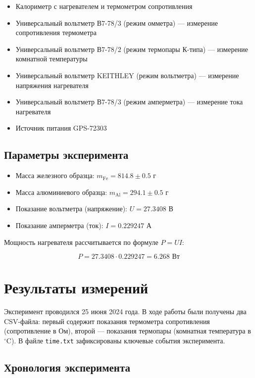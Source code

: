 \documentclass{article}
\begin{document}
\begin{itemize}
\item Калориметр с нагревателем и термометром сопротивления
\item Универсальный вольтметр В7-78/3 (режим омметра) — измерение сопротивления термометра
\item Универсальный вольтметр В7-78/2 (режим термопары К-типа) — измерение комнатной температуры
\item Универсальный вольтметр KEITHLEY (режим вольтметра) — измерение напряжения нагревателя
\item Универсальный вольтметр В7-78/3 (режим амперметра) — измерение тока нагревателя
\item Источник питания GPS-72303
\end{itemize}

\subsection*{Параметры эксперимента}

\begin{itemize}
\item Масса железного образца: $m_{\text{Fe}} = 814.8 \pm 0.5$ г
\item Масса алюминиевого образца: $m_{\text{Al}} = 294.1 \pm 0.5$ г
\item Показание вольтметра (напряжение): $U = 27.3408$ В
\item Показание амперметра (ток): $I = 0.229247$ А
\end{itemize}

Мощность нагревателя рассчитывается по формуле $P = UI$:

\begin{equation}
P = 27.3408 \cdot 0.229247 = 6.268 \text{ Вт}
\end{equation}

\section*{Результаты измерений}

Эксперимент проводился 25 июня 2024 года. В ходе работы были получены два CSV-файла: первый содержит показания термометра сопротивления (сопротивление в Ом), второй — показания термопары (комнатная температура в $^\circ$C). В файле \texttt{time.txt} зафиксированы ключевые события эксперимента.

\subsection*{Хронология эксперимента}
\end{document}

